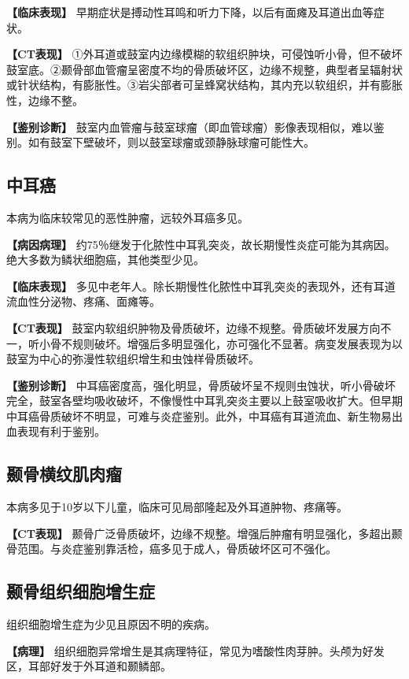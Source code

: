 \textbf{【临床表现】}
早期症状是搏动性耳鸣和听力下降，以后有面瘫及耳道出血等症状。

\textbf{【CT表现】}
①外耳道或鼓室内边缘模糊的软组织肿块，可侵蚀听小骨，但不破坏鼓室底。②颞骨部血管瘤呈密度不均的骨质破坏区，边缘不规整，典型者呈辐射状或针状结构，有膨胀性。③岩尖部者可呈蜂窝状结构，其内充以软组织，并有膨胀性，边缘不整。

\textbf{【鉴别诊断】}
鼓室内血管瘤与鼓室球瘤（即血管球瘤）影像表现相似，难以鉴别。如有鼓室下壁破坏，则以鼓室球瘤或颈静脉球瘤可能性大。

\subsection{中耳癌}

本病为临床较常见的恶性肿瘤，远较外耳癌多见。

\textbf{【病因病理】}
约75％继发于化脓性中耳乳突炎，故长期慢性炎症可能为其病因。绝大多数为鳞状细胞癌，其他类型少见。

\textbf{【临床表现】}
多见中老年人。除长期慢性化脓性中耳乳突炎的表现外，还有耳道流血性分泌物、疼痛、面瘫等。

\textbf{【CT表现】}
鼓室内软组织肿物及骨质破坏，边缘不规整。骨质破坏发展方向不一，听小骨不规则破坏。增强后多明显强化，亦可强化不显著。病变发展表现为以鼓室为中心的弥漫性软组织增生和虫蚀样骨质破坏。

\textbf{【鉴别诊断】}
中耳癌密度高，强化明显，骨质破坏呈不规则虫蚀状，听小骨破坏完全，鼓室各壁均吸收破坏，不像慢性中耳乳突炎主要以上鼓室吸收扩大。但早期中耳癌骨质破坏不明显，可难与炎症鉴别。此外，中耳癌有耳道流血、新生物易出血表现有利于鉴别。

\subsection{颞骨横纹肌肉瘤}

本病多见于10岁以下儿童，临床可见局部隆起及外耳道肿物、疼痛等。

\textbf{【CT表现】}
颞骨广泛骨质破坏，边缘不规整。增强后肿瘤有明显强化，多超出颞骨范围。与炎症鉴别靠活检，癌多见于成人，骨质破坏区可不强化。

\subsection{颞骨组织细胞增生症}

组织细胞增生症为少见且原因不明的疾病。

\textbf{【病理】}
组织细胞异常增生是其病理特征，常见为嗜酸性肉芽肿。头颅为好发区，耳部好发于外耳道和颞鳞部。

